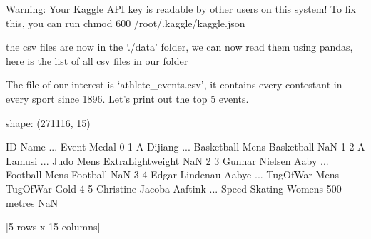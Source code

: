 \documentclass[letterpaper,10pt,english]{jupyterBook}
\begin{document}
\begin{sphinxVerbatim}[commandchars=\\\{\}]
Warning: Your Kaggle API key is readable by other users on this system! To fix this, you can run \PYGZsq{}chmod 600 /root/.kaggle/kaggle.json\PYGZsq{}
\end{sphinxVerbatim}

\sphinxAtStartPar
the csv files are now in the ‘./data’ folder, we can now read them using pandas, here is the list of all csv files in our folder

\begin{sphinxVerbatim}[commandchars=\\\{\}]
\end{sphinxVerbatim}

\begin{sphinxVerbatim}
\end{sphinxVerbatim}

\sphinxAtStartPar
The file of our interest is ‘athlete\_events.csv’, it contains every contestant in every sport since 1896. Let’s print out the top 5 events.

\begin{sphinxVerbatim}[commandchars=\\\{\}]
  
  
\end{sphinxVerbatim}

\begin{sphinxVerbatim}[commandchars=\\\{\}]
shape: (271116, 15)
\end{sphinxVerbatim}

\begin{sphinxVerbatim}[commandchars=\\\{\}]
   ID                      Name  ...                             Event  Medal
0   1                 A Dijiang  ...       Basketball Men\PYGZsq{}s Basketball    NaN
1   2                  A Lamusi  ...      Judo Men\PYGZsq{}s Extra\PYGZhy{}Lightweight    NaN
2   3       Gunnar Nielsen Aaby  ...           Football Men\PYGZsq{}s Football    NaN
3   4      Edgar Lindenau Aabye  ...       Tug\PYGZhy{}Of\PYGZhy{}War Men\PYGZsq{}s Tug\PYGZhy{}Of\PYGZhy{}War   Gold
4   5  Christine Jacoba Aaftink  ...  Speed Skating Women\PYGZsq{}s 500 metres    NaN

[5 rows x 15 columns]
\end{sphinxVerbatim}
\end{document}
